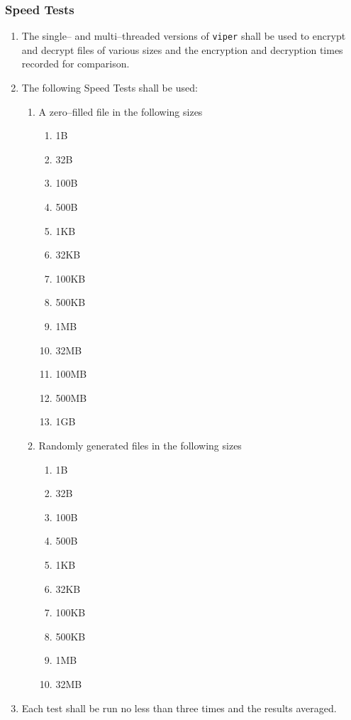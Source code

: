 \subsubsection{Speed Tests}
\begin{enumerate}
\item The single-- and multi--threaded versions of \texttt{viper} shall be used to encrypt and decrypt files of various sizes and the encryption and decryption times recorded for comparison.
\item The following Speed Tests shall be used:
	\begin{enumerate}
	\item A zero--filled file in the following sizes
		\begin{enumerate}
		\item 1B
		\item 32B
		\item 100B
		\item 500B
		\item 1KB
		\item 32KB
		\item 100KB
		\item 500KB
		\item 1MB
		\item 32MB
		\item 100MB
		\item 500MB
		\item 1GB
		\end{enumerate}
	\item Randomly generated files in the following sizes
		\begin{enumerate}
		\item 1B
		\item 32B
		\item 100B
		\item 500B
		\item 1KB
		\item 32KB
		\item 100KB
		\item 500KB
		\item 1MB
		\item 32MB
		\end{enumerate}
	\end{enumerate}
\item Each test shall be run no less than three times and the results averaged.
\end{enumerate}
